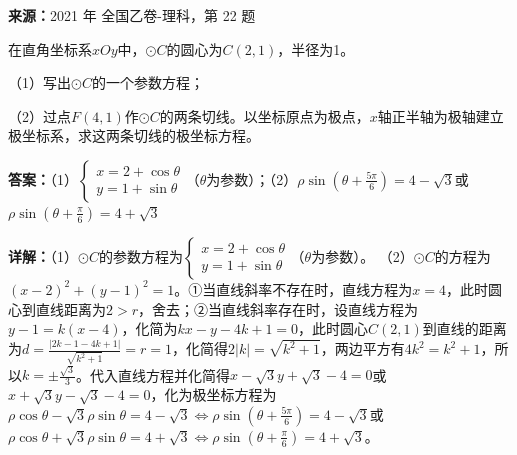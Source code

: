 \begin{question}[points=10]
\textbf{来源：}2021 年 全国乙卷-理科，第 22 题\par
在直角坐标系$xOy$中，$\odot C$的圆心为$C(2,1)$，半径为1。

（1）写出$\odot C$的一个参数方程；

（2）过点$F(4,1)$作$\odot C$的两条切线。以坐标原点为极点，$x$轴正半轴为极轴建立极坐标系，求这两条切线的极坐标方程。
\begin{solution}
\textbf{答案：}（1）$\begin{cases} x=2+\cos\theta\\ y=1+\sin\theta \end{cases}$（$\theta$为参数）；（2）$\rho\sin(\theta+\frac{5\pi}{6})=4-\sqrt{3}$或$\rho\sin(\theta+\frac{\pi}{6})=4+\sqrt{3}$

\textbf{详解：}（1）$\odot C$的参数方程为$\begin{cases} x=2+\cos\theta\\ y=1+\sin\theta \end{cases}$（$\theta$为参数）。
（2）$\odot C$的方程为$(x-2)^2+(y-1)^2=1$。①当直线斜率不存在时，直线方程为$x=4$，此时圆心到直线距离为$2>r$，舍去；②当直线斜率存在时，设直线方程为$y-1=k(x-4)$，化简为$kx-y-4k+1=0$，此时圆心$C(2,1)$到直线的距离为$d=\frac{|2k-1-4k+1|}{\sqrt{k^2+1}}=r=1$，化简得$2|k|=\sqrt{k^2+1}$，两边平方有$4k^2=k^2+1$，所以$k=\pm\frac{\sqrt3}{3}$。代入直线方程并化简得$x-\sqrt3y+\sqrt3-4=0$或$x+\sqrt3y-\sqrt3-4=0$，化为极坐标方程为$\rho\cos\theta-\sqrt3\rho\sin\theta=4-\sqrt3\Leftrightarrow\rho\sin(\theta+\frac{5\pi}{6})=4-\sqrt3$或$\rho\cos\theta+\sqrt3\rho\sin\theta=4+\sqrt3\Leftrightarrow\rho\sin(\theta+\frac{\pi}{6})=4+\sqrt3$。
\end{solution}
\end{question}

